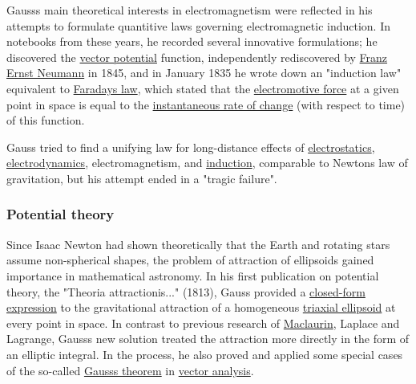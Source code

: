 Gauss\textquotesingle s main theoretical interests in electromagnetism were reflected in his attempts to formulate quantitive laws governing electromagnetic induction. In notebooks from these years, he recorded several innovative formulations; he discovered the \href{https://en.wikipedia.org/wiki/Vector_potential}{vector potential} function, independently rediscovered by \href{https://en.wikipedia.org/wiki/Franz_Ernst_Neumann}{Franz Ernst Neumann} in 1845, and in January 1835 he wrote down an "induction law" equivalent to \href{https://en.wikipedia.org/wiki/Faraday's_law_of_induction}{Faraday\textquotesingle s law}, which stated that the \href{https://en.wikipedia.org/wiki/Electromotive_force}{electromotive force} at a given point in space is equal to the \href{https://en.wikipedia.org/wiki/Instantaneous_rate_of_change}{instantaneous rate of change} (with respect to time) of this function.

Gauss tried to find a unifying law for long-distance effects of \href{https://en.wikipedia.org/wiki/Electrostatics}{electrostatics}, \href{https://en.wikipedia.org/wiki/Electrodynamics}{electrodynamics}, electromagnetism, and \href{https://en.wikipedia.org/wiki/Electric_Induction}{induction}, comparable to Newton\textquotesingle s law of gravitation, but his attempt ended in a "tragic failure".


\subsubsection{Potential theory}\label{Potential_theory}

Since Isaac Newton had shown theoretically that the Earth and rotating stars assume non-spherical shapes, the problem of attraction of ellipsoids gained importance in mathematical astronomy. In his first publication on potential theory, the "Theoria attractionis..." (1813), Gauss provided a \href{https://en.wikipedia.org/wiki/Closed-form_expression}{closed-form expression} to the gravitational attraction of a homogeneous \href{https://en.wikipedia.org/wiki/Triaxial_ellipsoid}{triaxial ellipsoid} at every point in space. In contrast to previous research of \href{https://en.wikipedia.org/wiki/Colin_Maclaurin}{Maclaurin}, Laplace and Lagrange, Gauss\textquotesingle s new solution treated the attraction more directly in the form of an elliptic integral. In the process, he also proved and applied some special cases of the so-called \href{https://en.wikipedia.org/wiki/Divergence_theorem}{Gauss\textquotesingle s theorem} in \href{https://en.wikipedia.org/wiki/Vector_analysis}{vector analysis}.

